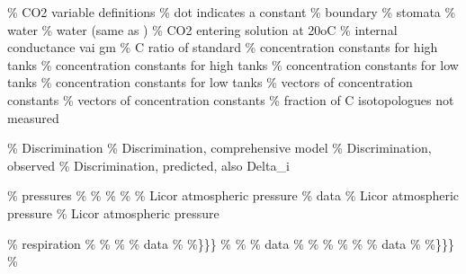 \documentclass[]{article}
\begin{document}
\% CO2 variable definitions \% dot indicates a constant
\newcommand{\sdotab}{\dot{a}_{\textrm{b}}} \% boundary
\newcommand{\sdota}{\dot{a}} \% stomata
\newcommand{\sdotaw}{\dot{a}_{\textrm{w}}} \% water
\newcommand{\sdotal}{\dot{a}_{\textrm{l}}} \% water (same as )
\newcommand{\sdotbs}{\dot{b}_{\textrm{s}}} \% CO2 entering solution at
20oC \newcommand{\sdotb}{\dot{b}} \% internal conductance vai gm
\newcommand{\sdotRstd}{\dot{R}_\textrm{std 13C}} \% C ratio of standard
\newcommand{\sdotkappaHtw}{\dot{\kappa}_{\textrm{H}12}} \% concentration
constants for high tanks
\newcommand{\sdotkappaHth}{\dot{\kappa}_{\textrm{H}13}} \% concentration
constants for high tanks
\newcommand{\sdotkappaLtw}{\dot{\kappa}_{\textrm{L}12}} \% concentration
constants for low tanks
\newcommand{\sdotkappaLth}{\dot{\kappa}_{\textrm{L}13}} \% concentration
constants for low tanks
\newcommand{\vdotkappaHtw}{{\dot{\kappa}}_{\textrm{H}}} \% vectors of
concentration constants
\newcommand{\vdotkappaLtw}{{\dot{\kappa}}_{\textrm{L}}} \% vectors of
concentration constants \newcommand{\sdotfthC}{\dot{f}_{\textrm{13C}}}
\% fraction of C isotopologues not measured

\% Discrimination \newcommand{\sDeltacomp}{\Delta_{\textrm{comp}}} \%
Discrimination, comprehensive model
\newcommand{\sDeltaobs}{\Delta_{\textrm{obs}}} \% Discrimination,
observed \newcommand{\sDeltapred}{\Delta_{\textrm{pred}}} \%
Discrimination, predicted, also Delta\_i

\% pressures \newcommand{\spa}{p_{\textrm{a}}} \%
\newcommand{\sps}{p_{\textrm{s}}} \% \newcommand{\spi}{p_{\textrm{i}}}
\% \newcommand{\spc}{p_{\textrm{c}}} \%
\newcommand{\spatmL}{p_{\textrm{atm}}} \% Licor atmospheric pressure
\newcommand{\sallpressures}{\pi_{}} \% data
\newcommand{\sdatapatmL}{\tilde{p}_{\textrm{atm}}} \% Licor atmospheric
pressure \newcommand{\ssigpatmL}{\sigma_{p_{\textrm{atm}}}^2} \% Licor
atmospheric pressure

\% respiration \newcommand{\sse}{e_{}} \%
\newcommand{\sseprime}{e_{}^{\prime}} \%
\newcommand{\sRd}{R_{\textrm{d}}} \% \% data
\newcommand{\sdataRd}{\tilde{R}_{\textrm{d}}} \%
\newcommand{\ssigRd}{\sigma_{R_{\textrm{d}}}^2}\%\}\}\} \%
\newcommand{\ssk}{k_{}} \% \% data \newcommand{\sdatak}{\tilde{k}_{}} \%
\newcommand{\ssigk}{\sigma_{k_{}}^2} \% \newcommand{\ssf}{f_{}} \%
\newcommand{\ssfprime}{f_{}^{\prime}} \%
\newcommand{\sGammastar}{\Gamma^{\ast}_{}} \% \% data
\newcommand{\sdataGammastar}{\tilde{\Gamma}^{\ast}_{}} \%
\newcommand{\ssigGammastar}{\sigma_{\Gamma^{\ast}_{}}^2}\%\}\}\} \%
\end{document}
